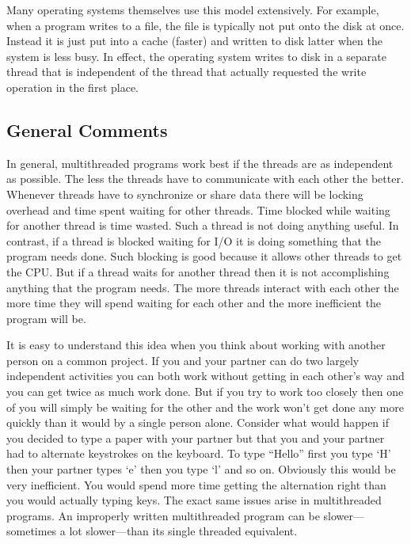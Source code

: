 Many operating systems themselves use this model extensively. For example, when a program writes
to a file, the file is typically not put onto the disk at once. Instead it is just put into a
cache (faster) and written to disk latter when the system is less busy. In effect, the operating
system writes to disk in a separate thread that is independent of the thread that actually
requested the write operation in the first place.

\subsection{General Comments}
\label{subsec:general-model}

In general, multithreaded programs work best if the threads are as independent as possible. The
less the threads have to communicate with each other the better. Whenever threads have to
synchronize or share data there will be locking overhead and time spent waiting for other
threads. Time blocked while waiting for another thread is time wasted. Such a thread is not
doing anything useful. In contrast, if a thread is blocked waiting for I/O it is doing something
that the program needs done. Such blocking is good because it allows other threads to get the
CPU. But if a thread waits for another thread then it is not accomplishing anything that the
program needs. The more threads interact with each other the more time they will spend waiting
for each other and the more inefficient the program will be.

It is easy to understand this idea when you think about working with another person on a common
project. If you and your partner can do two largely independent activities you can both work
without getting in each other's way and you can get twice as much work done. But if you try to
work too closely then one of you will simply be waiting for the other and the work won't get
done any more quickly than it would by a single person alone. Consider what would happen if you
decided to type a paper with your partner but that you and your partner had to alternate
keystrokes on the keyboard. To type ``Hello'' first you type `H' then your partner types `e'
then you type `l' and so on. Obviously this would be very inefficient. You would spend more time
getting the alternation right than you would actually typing keys. The exact same issues arise
in multithreaded programs. An improperly written multithreaded program can be slower---sometimes
a lot slower---than its single threaded equivalent.

